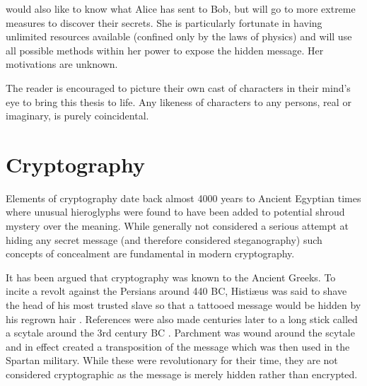  would also like to know what Alice has sent to Bob, but will go to more extreme measures to discover their secrets. She is particularly fortunate in having unlimited resources available (confined only by the laws of physics) and will use all possible methods within her power to expose the hidden message. Her motivations are unknown.

The reader is encouraged to picture their own cast of characters in their mind's eye to bring this thesis to life. Any likeness of characters to any persons, real or imaginary, is purely coincidental.

\section{Cryptography}
\label{sec1:crypto}

Elements of cryptography date back almost 4000 years to Ancient Egyptian times where unusual hieroglyphs were found to have been added to potential shroud mystery over the meaning\cite{singh1999code}. While generally not considered a serious attempt at hiding any secret message (and therefore considered steganography) such concepts of concealment are fundamental in modern cryptography.

It has been argued that cryptography was known to the Ancient Greeks. To incite a revolt against the Persians around 440 BC, Histi{\ae}us was said to shave the head of his most trusted slave so that a tattooed message would be hidden by his regrown hair \cite{Herodotus}. References were also made centuries later to a long stick called a scytale around the 3rd century BC \cite{Deipnosophistae}. Parchment was wound around the scytale and in effect created a transposition of the message which was then used in the Spartan military. While these were revolutionary for their time, they are not considered cryptographic as the message is merely hidden rather than encrypted.




